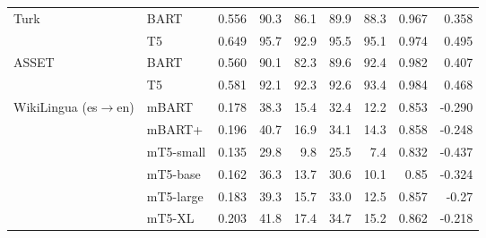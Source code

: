 \documentclass[11pt,a4paper]{article}
\begin{document}
\begin{table*}[!htbp]
\begin{tabular}{@{}llrrrrrrr@{}}
\midrule
\multirow{2}{*}{Turk} & \small{BART} & 0.556 & 90.3 & 86.1 & 89.9 & 88.3 & 0.967 & 0.358 \\
 & \small{T5} & 0.649 & 95.7 & 92.9 & 95.5 & 95.1 & 0.974 & 0.495 \\
\midrule
\multirow{2}{*}{ASSET} & \small{BART} & 0.560 & 90.1 & 82.3 & 89.6 & 92.4 & 0.982 & 0.407 \\
 & \small{T5} & 0.581 & 92.1 & 92.3 & 92.6 & 93.4 & 0.984 & 0.468 \\
\midrule
\multirow{2}{*}{WikiLingua (es$\rightarrow$en)} & \small{mBART} & 0.178 & 38.3 & 15.4 & 32.4 & 12.2 & 0.853 & -0.290 \\
 & \small{mBART+} & 0.196 & 40.7 & 16.9 & 34.1 & 14.3 & 0.858 & -0.248 \\
 & \small{mT5-small} & 0.135 & 29.8 & 9.8 & 25.5 & 7.4 & 0.832 & -0.437 \\
& \small{mT5-base} & 0.162 & 36.3 & 13.7 & 30.6 & 10.1 & 0.85 & -0.324 \\
& \small{mT5-large} & 0.183 & 39.3 & 15.7 & 33.0 & 12.5 & 0.857 & -0.27 \\
& \small{mT5-XL} & 0.203 & 41.8 & 17.4 & 34.7 & 15.2 & 0.862 & -0.218 \\


\end{tabular}
\end{table*}
\end{document}
